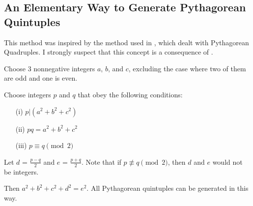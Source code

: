\documentclass[12pt]{article}
\theoremstyle{definition}
\theoremstyle{remark}
\numberwithin{equation}{section}
\begin{document}
\begin{enumerate}



\end{enumerate}




\begin{appendices}


\section{An Elementary Way to Generate Pythagorean Quintuples}
\label{appendix_elementary_way}

This method was inspired by the method used in \cite{New_Path}, which 
dealt with Pythagorean Quadruples. I strongly suspect that this concept
is a consequence of \cite{Formalized_New_Path}.


Choose 3 nonnegative integers $a$, $b$, and $c$, excluding the case 
where two of them are odd and one is even.





Choose integers $p$ and $q$ that obey the following 
conditions:


\begin{itemize}
\item[(i)]
$p|(a^2 + b^2 + c^2)$ 


\item[(ii)]
$pq = a^2 + b^2 + c^2$ 



\item[(iii)]
$p \equiv q \pmod 2$



\end{itemize}




Let $d$ = $\frac{p-q}{2}$ and
$e$ = $\frac{p+q}{2}$. 
Note that if $p \not\equiv q \pmod 2$, then $d$ and $e$
would not be integers.

Then $a^2 + b^2 + c^2 + d^2 = e^2$. All Pythagorean quintuples can 
be generated in this way.




\end{appendices}
\end{document}
